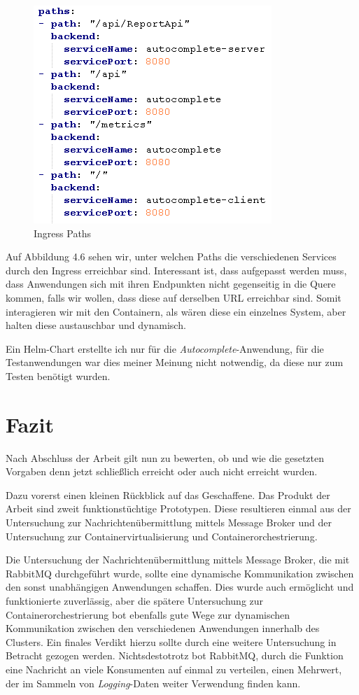 \documentclass[12pt,a4paper]{scrartcl}
\begin{document}
\begin{figure}[h!]
	\centering
	\includegraphics[scale=1]{KubeIngressPaths.png}
	\caption[Screenshot]{Ingress Paths}
\end{figure}

Auf Abbildung 4.6 sehen wir, unter welchen Paths die verschiedenen Services durch den Ingress erreichbar sind. Interessant ist, dass aufgepasst werden muss, dass Anwendungen sich mit ihren Endpunkten nicht gegenseitig in die Quere kommen, falls wir wollen, dass diese auf derselben URL erreichbar sind. 
Somit interagieren wir mit den Containern, als wären diese ein einzelnes System, aber halten diese austauschbar und dynamisch.

Ein Helm-Chart erstellte ich nur für die \emph{Autocomplete}-Anwendung, für die Testanwendungen war dies meiner Meinung nicht notwendig, da diese nur zum Testen benötigt wurden.


\newpage
\section{Fazit}\label{conclusion}
Nach Abschluss der Arbeit gilt nun zu bewerten, ob und wie die gesetzten Vorgaben denn jetzt schließlich erreicht oder auch nicht erreicht wurden.

Dazu vorerst einen kleinen Rückblick auf das Geschaffene. Das Produkt der Arbeit sind zweit funktionstüchtige Prototypen. Diese resultieren einmal aus der Untersuchung zur Nachrichtenübermittlung mittels Message Broker und der Untersuchung zur Containervirtualisierung und Containerorchestrierung. 

Die Untersuchung der Nachrichtenübermittlung mittels Message Broker, die mit RabbitMQ durchgeführt wurde, sollte eine dynamische Kommunikation zwischen den sonst unabhängigen Anwendungen schaffen. Dies wurde auch ermöglicht und funktionierte zuverlässig, aber die spätere Untersuchung zur Containerorchestrierung bot ebenfalls gute Wege zur dynamischen Kommunikation zwischen den verschiedenen Anwendungen innerhalb des Clusters. Ein finales Verdikt hierzu sollte durch eine weitere Untersuchung in Betracht gezogen werden. Nichtsdestotrotz bot RabbitMQ, durch die Funktion eine Nachricht an viele Konsumenten auf einmal zu verteilen, einen Mehrwert, der im Sammeln von \emph{Logging}-Daten weiter Verwendung finden kann.
\end{document}
